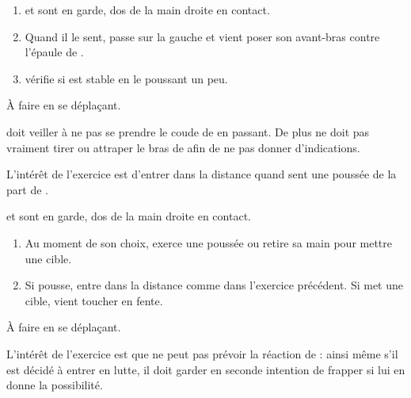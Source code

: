 \begin{exercice}

	\begin{enumerate}
		\item \A et \D sont en garde, dos de la main droite en contact.
		
		\item Quand il le sent, \A passe sur la gauche et vient poser son avant-bras contre l'épaule de \D.
		
		\item \D vérifie si \A est stable en le poussant un peu.
	\end{enumerate}

	À faire en se déplaçant.

	\A doit veiller à ne pas se prendre le coude de \D en passant.
	De plus \A ne doit pas vraiment tirer ou attraper le bras de \D afin de ne pas donner d'indications.

	L'intérêt de l'exercice est d'entrer dans la distance quand \A sent une poussée de la part de \D.

\end{exercice}


\begin{exercice}

	\A et \D sont en garde, dos de la main droite en contact.

	\begin{enumerate}
		\item Au moment de son choix, \D exerce une poussée ou retire sa main pour mettre une cible.
		
		\item Si \D pousse, \A entre dans la distance comme dans l'exercice précédent.
		Si \D met une cible, \A vient toucher en fente.
	\end{enumerate}

	À faire en se déplaçant.

	L'intérêt de l'exercice est que \A ne peut pas prévoir la réaction de \D : ainsi même s'il est décidé à entrer en lutte, il doit garder en seconde intention de frapper si \D lui en donne la possibilité.

\end{exercice}


